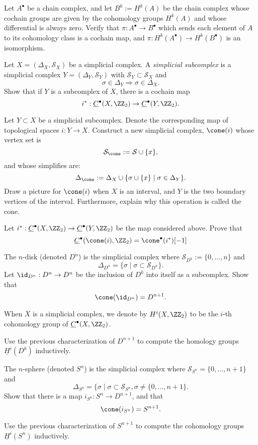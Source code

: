 \begin{exercise}
	Let $A^\bullet$ be a chain complex, and let $B^k:=H^k(A)$ be the chain complex whose cochain groups are given by the cohomology groups $H^k(A)$ and whose differential is always zero. 
	Verify that $\pi: A^\bullet\to B^\bullet$ which sends each element of $A$ to its cohomology class is a cochain map, and $\pi: H^k(A^\bullet)\to H^k(B^\bullet)$ is an isomorphism.
\end{exercise}
\begin{exercise}
	Let $X=(\Delta_X, \mathcal S_X)$ be a simplicial complex. A \emph{simplicial subcomplex} is a simplicial complex $Y=(\Delta_Y, \mathcal S_Y)$ with $\mathcal S_Y\subset \mathcal S_X$ and 
	\[\sigma\in \Delta_Y \Rightarrow \sigma\in \Delta_X.\]
	Show that if $Y$ is a subcomplex of $X$, there is a cochain map \[i^*: \underline C^\bullet(X, \ZZ_2)\to \underline C^\bullet(Y, \ZZ_2).\]
\end{exercise}
\begin{exercise}
	Let $Y\subset X$ be a simplicial subcomplex. 
	Denote the corresponding map of topological spaces $i: Y\to X$.
	Construct a new simplicial complex, $\cone(i)$ whose vertex set is  \[\mathcal S_{\cone}:= \mathcal S\cup\{x\},\]
	and whose simplifies are:
	\[\Delta_{\cone}:=\Delta_X\cup\{\sigma\cup\{x\}\;|\; \sigma \in \Delta_Y\}.\]
	Draw a picture for $\cone(i)$ when $X$ is an interval, and $Y$ is the two boundary vertices of the interval. 
	Furthermore, explain why this operation is called the cone.
\end{exercise}
\begin{exercise}
	Let $i^*:\underline C^\bullet(X, \ZZ_2)\to \underline C^\bullet(Y, \ZZ_2)$ be the map considered above. Prove that \[\underline C^\bullet(\cone(i), \ZZ_2 )=\cone^\bullet(i^*)[-1]\]
\end{exercise}
\begin{exercise}
	The $n$-disk  (denoted $D^n$) is the simplicial complex where $\mathcal S_{D^k}:=\{0, \ldots, n\}$ and 
	\[\Delta_{D^n}=\{\sigma \;|\; \sigma\subset \mathcal S_{D^n}\}.\]
	Let $\id_{D^n}: D^n\to D^n$ be the inclusion of $D^k$ into itself as a subcomplex. Show that 
	\[\cone(\id_{D^n})=D^{n+1}.\]
\end{exercise}
When $X$ is a simplicial complex, we denote by $H^i(X, \ZZ_2)$ to be the $i$-th cohomology group of $\underline C^\bullet(X, \ZZ_2)$.
\begin{exercise}
	Use the previous characterization of $D^{n+1}$ to compute the homology groups $\underline H^i(D^k)$ inductively. 
\end{exercise}
\begin{exercise}
	The $n$-sphere (denoted $S^n$) is the simplicial complex where ${\mathcal S}_{S^n}=\{0, \ldots, n+1\}$ and 
	\[\Delta_{S^n}=\{\sigma \;|\; \sigma\subset {\mathcal S}_{S^n}, \sigma \neq \{0, \ldots, n+1\}.\]
	Show that there is a map $i_{S^n}: S^n\to D^{n+1}$, and that 
	\[\cone(i_{S^n})=S^{n+1}.\]
\end{exercise}
\begin{exercise}
	Use the previous characterization of $S^{n+1}$ to compute the cohomology groups $\underline H^i(S^n)$ inductively. 
\end{exercise}

